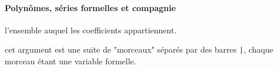\documentclass[12pt,a4paper]{article}
\begin{document}
\paragraph{Polynômes, séries formelles et compagnie}



\extraspace



\extraspace



 l'ensemble auquel les coefficients appartiennent.

 cet argument est une suite de "morceaux" séparés par des barres \verb+|+, chaque morceau étant une variable formelle.
\end{document}

